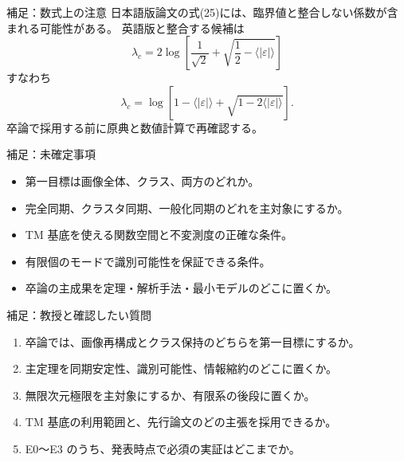 \documentclass[aspectratio=169,11pt]{beamer}
\begin{document}
\begin{frame}{補足：数式上の注意}
  日本語版論文の式(25)には、臨界値と整合しない係数が含まれる可能性がある。
  英語版と整合する候補は
  \[
    \lambda_c=
    2\log\left[
      \frac1{\sqrt2}+\sqrt{\frac12-\langle|\varepsilon|\rangle}
    \right]
  \]
  すなわち
  \[
    \lambda_c=
    \log\left[
      1-\langle|\varepsilon|\rangle
      +\sqrt{1-2\langle|\varepsilon|\rangle}
    \right].
  \]
  卒論で採用する前に原典と数値計算で再確認する。
\end{frame}

\begin{frame}{補足：未確定事項}
  \begin{itemize}
    \item 第一目標は画像全体、クラス、両方のどれか。
    \item 完全同期、クラスタ同期、一般化同期のどれを主対象にするか。
    \item TM 基底を使える関数空間と不変測度の正確な条件。
    \item 有限個のモードで識別可能性を保証できる条件。
    \item 卒論の主成果を定理・解析手法・最小モデルのどこに置くか。
  \end{itemize}
\end{frame}

\begin{frame}{補足：教授と確認したい質問}
  \begin{enumerate}
    \item 卒論では、画像再構成とクラス保持のどちらを第一目標にするか。
    \item 主定理を同期安定性、識別可能性、情報縮約のどこに置くか。
    \item 無限次元極限を主対象にするか、有限系の後段に置くか。
    \item TM 基底の利用範囲と、先行論文のどの主張を採用できるか。
    \item E0〜E3 のうち、発表時点で必須の実証はどこまでか。
  \end{enumerate}
\end{frame}
\end{document}

